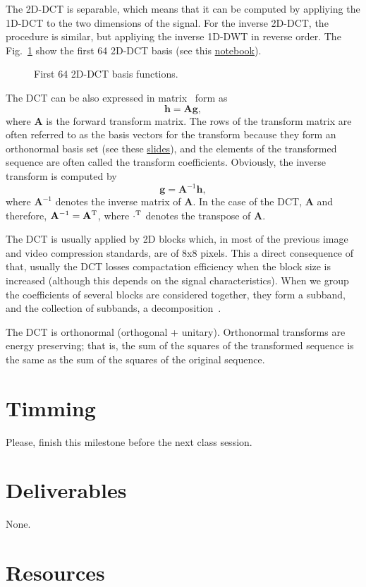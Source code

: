 The 2D-DCT is separable, which means that it can be computed by
appliying the 1D-DCT to the two dimensions of the signal. For the
inverse 2D-DCT, the procedure is similar, but appliying the inverse
1D-DWT in reverse order. The Fig.~\ref{fig:2D-DCT_basis} show the
first 64 2D-DCT basis (see this \href{}{notebook}).

\begin{figure}
  \centering
  \caption{First 64 2D-DCT basis functions.}
  \label{fig:2D-DCT_basis}
\end{figure}

The DCT can be also expressed in matrix~\cite{sayood2017introduction}
form as
\begin{equation}
  {\mathbf h} = {\mathbf A}{\mathbf g},
\end{equation}
where ${\mathbf A}$ is the forward transform matrix. The rows of the
transform matrix are often referred to as the basis vectors for the
transform because they form an orthonormal basis set (see these
\href{https://cseweb.ucsd.edu/classes/fa17/cse166-a/lec13.pdf}{slides}),
and the elements of the transformed sequence are often called the
transform coefficients. Obviously, the inverse transform is computed
by
\begin{equation}
  {\mathbf g} = {\mathbf A}^{-1}{\mathbf h},
\end{equation}
where ${\mathbf A}^{-1}$ denotes the inverse matrix of ${\mathbf
  A}$. In the case of the DCT, ${\mathbf A}$ and therefore, ${\mathbf
  A}^{-1}={\mathbf A}^{\text T}$, where $\cdot^{\text T}$ denotes the
transpose of ${\mathbf A}$.

The DCT is usually applied by 2D blocks which, in most of the previous
image and video compression standards, are of 8x8 pixels. This a
direct consequence of that, usually the DCT losses compactation
efficiency when the block size is increased (although this depends on
the signal characteristics). When we group the coefficients of several
blocks are considered together, they form a subband, and the
collection of subbands, a
decomposition~\cite{vetterli2014foundations}.

The DCT is orthonormal (orthogonal + unitary). Orthonormal transforms
are energy preserving; that is, the sum of the squares of the
transformed sequence is the same as the sum of the squares of the
original sequence.

\section{Timming}

Please, finish this milestone before the next class session.

\section{Deliverables}

None.

\section{Resources}

\renewcommand{\addcontentsline}[3]{}%

